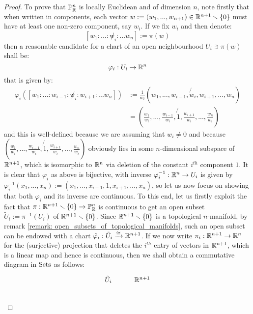 \begin{proof}
                To prove that $\P^n_{\R}$ is locally Euclidean and of dimension $n$, note firstly that when written in components, each vector $w := (w_1, ..., w_{n + 1}) \in \R^{n + 1} \setminus \{0\}$ must have at least one non-zero component, say $w_i$. If we fix $w_i$ and then denote:
                    $$[w_1 : ... : \not w_i : ... w_n] := \pi(w)$$
                then a reasonable candidate for a chart of an open neighbourhood $U_i \ni \pi(w)$ shall be:
                    $$\varphi_i: U_i \to \R^n$$
                that is given by:
                    $$
                        \begin{aligned}
                            \varphi_i( [w_1 : ... : w_{i - 1} : \not w_i : w_{i + 1} : ... w_n] ) & := \frac{1}{w_i} ( w_1, ..., w_{i - 1}, \not{w}_i, w_{i + 1}, ..., w_n )
                            \\
                            & = \left( \frac{w_1}{w_i}, ..., \frac{w_{i - 1}}{w_i}, \not{1}, \frac{w_{i + 1}}{w_i}, ..., \frac{w_n}{w_i} \right)
                        \end{aligned}
                    $$
                and this is well-defined because we are assuming that $w_i \not = 0$ and because $\left( \frac{w_1}{w_i}, ..., \frac{w_{i - 1}}{w_i}, \not{1}, \frac{w_{i + 1}}{w_i}, ..., \frac{w_n}{w_i} \right)$ obviously lies in some $n$-dimensional subspace of $\R^{n + 1}$, which is isomorphic to $\R^n$ via deletion of the constant $i^{th}$ component $1$. It is clear that $\varphi_i$ as above is bijective, with inverse $\varphi_i^{-1}: \R^n \to U_i$ is given by $\varphi_i^{-1}(x_1, ..., x_n) := (x_1, ..., x_{i - 1}, 1, x_{i + 1}, ..., x_n)$, so let us now focus on showing that both $\varphi_i$ and its inverse are continuous. To this end, let us firstly exploit the fact that $\pi: \R^{n + 1} \setminus \{0\} \to \P^n_{\R}$ is continuous to get an open subset $\tilde{U}_i := \pi^{-1}(U_i)$ of $\R^{n + 1} \setminus \{0\}$. Since $\R^{n + 1} \setminus \{0\}$ is a topological $n$-manifold, by remark \ref{remark: open_subsets_of_topological_manifolds}, such an open subset can be endowed with a chart $\tilde{\varphi}_i: \tilde{U}_i \xrightarrow[]{\cong} \R^{n + 1}$. If we now write $\pi_i: \R^{n + 1} \to \R^n$ for the (surjective) projection that deletes the $i^{th}$ entry of vectors in $\R^{n + 1}$, which is a linear map and hence is continuous, then we shall obtain a commutative diagram in $\Sets$ as follows:
                    $$
                        \begin{tikzcd}
                            {\tilde{U}_i} & {\R^{n + 1}} \\

\end{tikzcd}$$
\end{proof}
